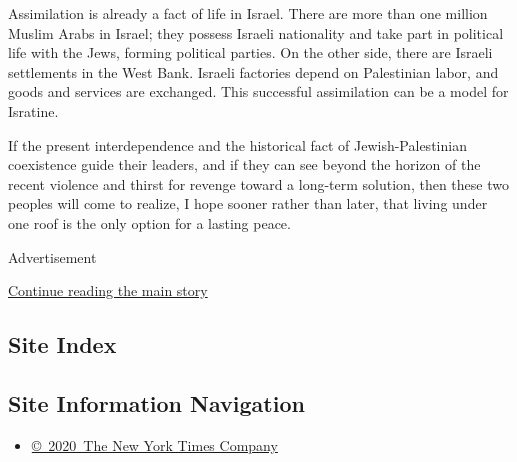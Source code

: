 Assimilation is already a fact of life in Israel. There are more than
one million Muslim Arabs in Israel; they possess Israeli nationality and
take part in political life with the Jews, forming political parties. On
the other side, there are Israeli settlements in the West Bank. Israeli
factories depend on Palestinian labor, and goods and services are
exchanged. This successful assimilation can be a model for Isratine.

If the present interdependence and the historical fact of
Jewish-Palestinian coexistence guide their leaders, and if they can see
beyond the horizon of the recent violence and thirst for revenge toward
a long-term solution, then these two peoples will come to realize, I
hope sooner rather than later, that living under one roof is the only
option for a lasting peace.

Advertisement

\protect\hyperlink{after-bottom}{Continue reading the main story}

\hypertarget{site-index}{%
\subsection{Site Index}\label{site-index}}

\hypertarget{site-information-navigation}{%
\subsection{Site Information
Navigation}\label{site-information-navigation}}

\begin{itemize}
\tightlist
\item
  \href{https://help.nytimes.com/hc/en-us/articles/115014792127-Copyright-notice}{©~2020~The
  New York Times Company}
\end{itemize}


